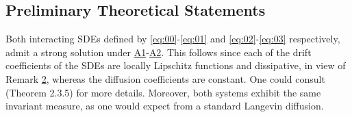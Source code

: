 \documentclass[a4paper, 10pt]{article}
\theoremstyle{plain}%
\begin{document}
\subsection{Preliminary Theoretical Statements}

 Both interacting SDEs defined by \eqref{eq:00}-\eqref{eq:01} and \eqref{eq:02}-\eqref{eq:03} respectively, admit a strong solution under \hyperlink{Assum1}{A1}-\hyperlink{Assum2}{A2}. This follows since each of the drift coefficients of the SDEs are locally Lipschitz functions and dissipative, in view of Remark  \hyperlink{Remark2}{2}, whereas the diffusion coefficients are constant. One could consult \cite{Mao} (Theorem 2.3.5) for more details.\label{statements} Moreover, both systems exhibit the same invariant measure, as one would expect from a standard Langevin diffusion.\\\raggedright
 
\end{document}
